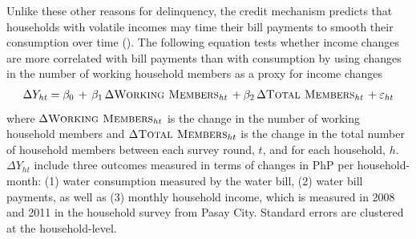 \documentclass[12pt,table]{article}
\begin{document}


Unlike these other reasons for delinquency, the credit mechanism predicts that households with volatile incomes may time their bill payments to smooth their consumption over time (\cite{deaton1991saving}).  The following equation tests whether income changes are more correlated with bill payments than with consumption by using changes in the number of working household members as a proxy for income changes
\begin{align*}
\Delta Y_{ht} =\beta_0\,+\, \beta_1\, \Delta \textsc{Working Members}_{ht} \, + \beta_2\, \Delta \textsc{Total Members}_{ht}   \,+\varepsilon_{ht}
\end{align*}
where $ \Delta \textsc{Working Members}_{ht} $ is the change in the number of working household members and $\Delta \textsc{Total Members}_{ht}$ is the change in the total number of household members between each survey round, $t$, and for each household, $h$.  $\Delta Y_{ht}$ include three outcomes measured in terms of changes in PhP per household-month: (1) water consumption measured by the water bill, (2) water bill payments, as well as (3) monthly household income, which is measured in 2008 and 2011 in the household survey from Pasay City.  Standard errors are clustered at the household-level.
\end{document}

